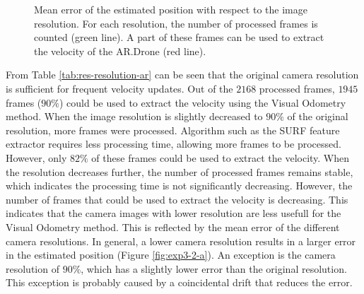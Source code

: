 \begin{figure}[htb!]
  \begin{center}

 \end{center}
  \caption{Mean error of the estimated position with respect to the image resolution. For each resolution, the number of processed frames is counted (green line). A part of these frames can be used to extract the velocity of the AR.Drone (red line).}
  \label{fig:exp3-error2}
\end{figure}


From Table \ref{tab:res-resolution-ar} can be seen that the original camera resolution is sufficient for frequent velocity updates.
Out of the $2168$ processed frames, $1945$ frames ($90\%$) could be used to extract the velocity using the Visual Odometry method.
When the image resolution is slightly decreased to $90\%$ of the original resolution, more frames were processed.
Algorithm such as the SURF feature extractor requires less processing time, allowing more frames to be processed.
However, only $82\%$ of these frames could be used to extract the velocity.
When the resolution decreases further, the number of processed frames remains stable, which indicates the processing time is not significantly decreasing.
However, the number of frames that could be used to extract the velocity is decreasing.
This indicates that the camera images with lower resolution are less usefull for the Visual Odometry method.
This is reflected by the mean error of the different camera resolutions.
In general, a lower camera resolution results in a larger error in the estimated position (Figure \ref{fig:exp3-2-a}).
An exception is the camera resolution of $90\%$, which has a slightly lower error than the original resolution.
This exception is probably caused by a coincidental drift that reduces the error.

